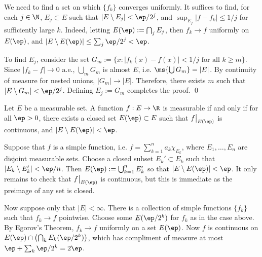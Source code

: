 \pf We need to find a set on which $\{f_k\}$ converges uniformly. It suffices to find, for each $j \in \N$, $E_j \subset E$ such that $|E \setminus E_j|< \ep/2^j$, and $\sup_{E_j} |f-f_k| \leq 1/j$ for sufficiently large $k$. Indeed, letting $E(\ep):= \bigcap_j E_j$, then $f_k \to f$ uniformly on $E(\ep)$, and $|E \setminus E(\ep)| \leq \sum_j \ep/2^j<\ep$. 

To find $E_j$, consider the set $G_m:=\{ x \colon |f_k(x)-f(x)| <1/j \text{ for all } k \geq m\}$. Since $|f_k-f| \to 0$ a.e., $\bigcup_m G_m$ is almost $E$, i.e. $\ms{\bigcup G_m}= |E|$. By continuity of measure for nested unions, $|G_m| \to |E|$. Therefore, there exists $m$ such that $|E \setminus G_m|< \ep/2^j$. Defining $E_j:= G_m$ completes the proof. \qed \\







\begin{thm}
Let $E$ be a measurable set. A function $f: E \to \R$ is measurable if and only if for all $\ep>0$, there exists a closed set $E(\ep) \subset E$ such that $f\big|_{E(\ep)}$ is continuous, and $|E\setminus E(\ep)|<\ep$.
\end{thm}

\pf Suppose that $f$ is a simple function, i.e. $f= \sum_{k=1}^n a_k \chi_{E_k}$, where $E_1,\ldots,E_n$ are disjoint measurable sets. Choose a closed subset $E_k' \subset E_k$ such that $|E_k \setminus E_k'| < \ep/n$. Then $E(\ep):= \bigcup_{k=1}^n E_k'$ so that $|E\setminus E(\ep)|<\ep$. It only remains to check that $f\big|_{E(\ep)}$ is continuous, but this is immediate as the preimage of any set is closed.  


Now suppose only that $|E|<\infty$. There is a collection of simple functions $\{f_k\}$ such that $f_k \to f$ pointwise. Choose some $E(\ep/2^k)$ for $f_k$ as in the case above. By Egorov's Theorem, $f_k \to f$ uniformly on a set $E(\ep)$. Now $f$ is continuous on $E(\ep) \cap \left(\bigcap_k E_k(\ep/2^k)\right)$, which has compliment of measure at most $\ep+ \sum_k \ep/2^k=2\ep$. 

